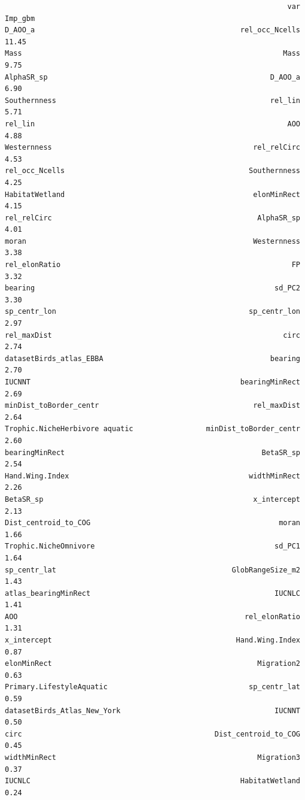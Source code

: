 \documentclass[
  letterpaper,
  DIV=11,
  numbers=noendperiod]{scrreprt}
\begin{document}
\begin{verbatim}
                                                                  var Imp_gbm
D_AOO_a                                                rel_occ_Ncells   11.45
Mass                                                             Mass    9.75
AlphaSR_sp                                                    D_AOO_a    6.90
Southernness                                                  rel_lin    5.71
rel_lin                                                           AOO    4.88
Westernness                                               rel_relCirc    4.53
rel_occ_Ncells                                           Southernness    4.25
HabitatWetland                                            elonMinRect    4.15
rel_relCirc                                                AlphaSR_sp    4.01
moran                                                     Westernness    3.38
rel_elonRatio                                                      FP    3.32
bearing                                                        sd_PC2    3.30
sp_centr_lon                                             sp_centr_lon    2.97
rel_maxDist                                                      circ    2.74
datasetBirds_atlas_EBBA                                       bearing    2.70
IUCNNT                                                 bearingMinRect    2.69
minDist_toBorder_centr                                    rel_maxDist    2.64
Trophic.NicheHerbivore aquatic                 minDist_toBorder_centr    2.60
bearingMinRect                                              BetaSR_sp    2.54
Hand.Wing.Index                                          widthMinRect    2.26
BetaSR_sp                                                 x_intercept    2.13
Dist_centroid_to_COG                                            moran    1.66
Trophic.NicheOmnivore                                          sd_PC1    1.64
sp_centr_lat                                         GlobRangeSize_m2    1.43
atlas_bearingMinRect                                           IUCNLC    1.41
AOO                                                     rel_elonRatio    1.31
x_intercept                                           Hand.Wing.Index    0.87
elonMinRect                                                Migration2    0.63
Primary.LifestyleAquatic                                 sp_centr_lat    0.59
datasetBirds_Atlas_New_York                                    IUCNNT    0.50
circ                                             Dist_centroid_to_COG    0.45
widthMinRect                                               Migration3    0.37
IUCNLC                                                 HabitatWetland    0.24

\end{verbatim}
\end{document}
